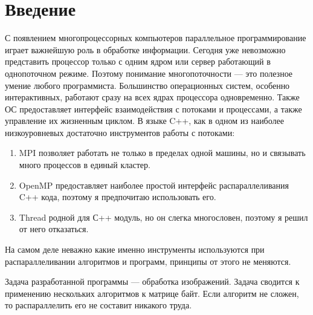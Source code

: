 \section*{Введение}
С появлением многопроцессорных компьютеров параллельное программирование играет важнейшую роль в обработке информации.
Сегодня уже невозможно представить процессор только с одним ядром или сервер работающий в однопоточном режиме.
Поэтому понимание многопоточности --- это полезное умение любого программиста.
Большинство операционных систем, особенно интерактивных, работают сразу на всех ядрах процессора одновременно.
Также ОС предоставляет интерфейс взаимодействия с потоками и процессами, а также управление их жизненным циклом.
В языке C++, как в одном из наиболее низкоуровневых достаточно инструментов работы с потоками:
\begin{enumerate}
    \item MPI позволяет работать не только в пределах одной машины, но и связывать много процессов в единый кластер.
    \item OpenMP предоставляет наиболее простой интерфейс распараллеливания C++ кода, поэтому я предпочитаю использовать его.
    \item Thread родной для С++ модуль, но он слегка многословен, поэтому я решил от него отказаться.{}
\end{enumerate}
На самом деле неважно какие именно инструменты используются при распараллеливании алгоритмов и программ, принципы от этого не меняются.

Задача разработанной программы --- обработка изображений.
Задача сводится к применению нескольких алгоритмов к матрице байт.
Если алгоритм не сложен, то распараллелить его не составит никакого труда.